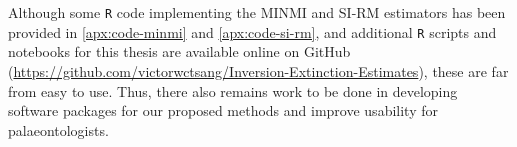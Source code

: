 Although some \texttt{R} code implementing the MINMI and SI-RM estimators has been provided in \autoref{apx:code-minmi} and \autoref{apx:code-si-rm}, and additional \texttt{R} scripts and notebooks for this thesis are available online on GitHub (\url{https://github.com/victorwctsang/Inversion-Extinction-Estimates}), these are far from easy to use. Thus, there also remains work to be done in developing software packages for our proposed methods and improve usability for palaeontologists.
